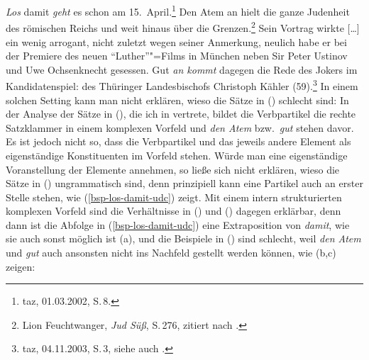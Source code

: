 \ex\label{bsp-los-damit-udc} 
\emph{Los} damit \emph{geht} es schon am 15.\ April.\footnote{
        taz, 01.03.2002, S.\,8.%
    }
\ex\label{bsp-den-atem-an-haelt-udc}
Den Atem an hielt die ganze Judenheit des römischen Reichs und weit hinaus über die Grenzen.\footnote{
        Lion Feuchtwanger, \emph{Jud Süß}, S.\,276, zitiert nach .
}
\ex Sein Vortrag wirkte [\ldots] %
ein wenig arrogant, nicht zuletzt wegen seiner Anmerkung,
neulich habe er bei der Premiere des neuen "`Luther"'"=Films in München neben
Sir Peter Ustinov und Uwe Ochsenknecht gesessen. %
Gut \emph{an kommt} dagegen die Rede des Jokers im Kandidatenspiel: des Thüringer Landesbischofs Christoph Kähler (59).\footnote{
        taz, 04.11.2003, S.\,3, siehe auch .%
}
\zl
In einem solchen Setting kann man nicht erklären, wieso die Sätze in () schlecht sind:
\eal
{}
\zl
In der Analyse der Sätze in (), die ich in  vertrete, bildet
die Verbpartikel die rechte Satzklammer in einem komplexen Vorfeld
und \emph{den Atem} bzw.\ \emph{gut} stehen davor. Es ist jedoch nicht so, dass die Verbpartikel
und das jeweils andere Element als eigenständige Konstituenten im Vorfeld stehen. Würde man eine
eigenständige Voranstellung der Elemente annehmen, so ließe sich nicht erklären, wieso die Sätze
in () ungrammatisch sind, denn prinzipiell kann eine Partikel auch an erster Stelle stehen,
wie (\ref{bsp-los-damit-udc}) zeigt. Mit einem intern strukturierten komplexen Vorfeld sind die Verhältnisse
in () und () dagegen erklärbar, denn dann ist die Abfolge in (\ref{bsp-los-damit-udc}) eine
Extraposition von \emph{damit}, wie sie auch sonst möglich ist (a), und die
Beispiele in () sind schlecht, weil \emph{den Atem} und \emph{gut} auch ansonsten nicht ins
Nachfeld gestellt werden können, wie (b,c) zeigen:
\eal
{}
\zl
\largerpage

